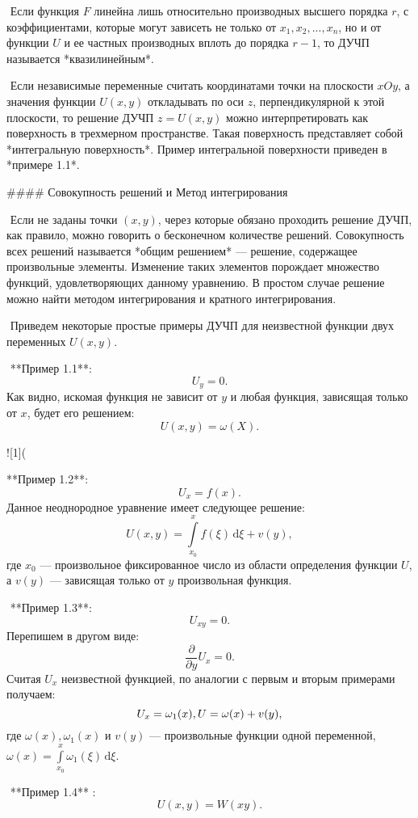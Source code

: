 ​	Если функция $F$ линейна лишь относительно производных высшего порядка $r$, с коэффициентами, которые могут зависеть не только от $x_1, x_2, ..., x_n$, но и от функции $U$ и ее частных производных вплоть до порядка $r − 1$, то ДУЧП называется *квазилинейным*.

​	Если независимые переменные считать координатами точки на плоскости $xOy$, а значения функции $U(x, y)$ откладывать по оси $z$, перпендикулярной к этой плоскости, то решение ДУЧП $z = U(x, y)$ можно интерпретировать как поверхность в трехмерном пространстве. Такая поверхность представляет собой *интегральную поверхность*. Пример интегральной поверхности приведен в *примере 1.1*.

#### Совокупность решений и Метод интегрирования

​	Если не заданы точки $(x,y)$, через которые обязано проходить решение ДУЧП, как правило, можно говорить о бесконечном количестве решений. Совокупность всех решений называется *общим решением* — решение, содержащее произвольные элементы. Изменение таких элементов порождает множество функций, удовлетворяющих данному уравнению. В простом случае решение можно найти методом интегрирования и кратного интегрирования.

​	Приведем некоторые простые примеры ДУЧП для неизвестной функции двух переменных $U(x,y)$.

​	**Пример 1.1**:
$$
U_y = 0.
$$
​	Как видно, искомая функция не зависит от $y$ и любая функция, зависящая только от $x$, будет его решением:
$$
U(x,y) = \omega(X).
$$

![1](%

**Пример 1.2**:
$$
U_x = f(x).
$$
​	Данное неоднородное уравнение имеет следующее решение:
$$
U(x,y) = \int\limits_{x_0}^x f(\xi)\, \mathrm{d}\xi + v(y),
$$
где $x_0$ — произвольное фиксированное число из области определения функции $U$, а $v(y)$ — зависящая только от $y$ произвольная функция.

​	**Пример 1.3**:
$$
U_{xy} = 0.
$$
​	Перепишем в другом виде:
$$
\frac{\partial }{\partial y} U_x = 0.
$$
​	Считая $U_x$ неизвестной функцией, по аналогии с первым и вторым примерами получаем:
$$
U_x = \omega_1(x),\\
U = \omega(x) + v(y),
$$
где $\omega(x), \omega_1(x)$ и $v(y)$ — произвольные функции одной переменной, $\omega(x) = \int\limits_{x_0}^x \omega_1(\xi)\, \mathrm{d}\xi$.

​	**Пример 1.4** :
$$
U(x,y) = W(xy).
$$

